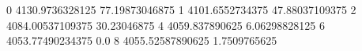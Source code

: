 0 4130.9736328125 77.19873046875
1 4101.6552734375 47.88037109375
2 4084.00537109375 30.23046875
4 4059.837890625 6.06298828125
6 4053.77490234375 0.0
8 4055.52587890625 1.7509765625
